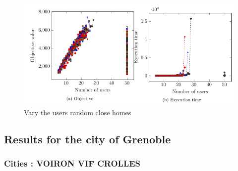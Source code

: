 \documentclass[12pt, a4paper, twoside]{memoir}
\begin{document}
{	\begin{figure}[H]
		\centering
		\begin{flushleft}
			\includegraphics[scale=0.9]{img/compiledResults/13.png}
		\end{flushleft}
		\caption{Vary the users random close homes}
		\label{fig:Vary the users random close homes}
	\end{figure}
	
	\subsection{Results for the city of Grenoble}
	\label{app:Results for the city of Grenoble}
	
	\subsubsection{Cities : VOIRON VIF CROLLES}
	
}
\end{document}
